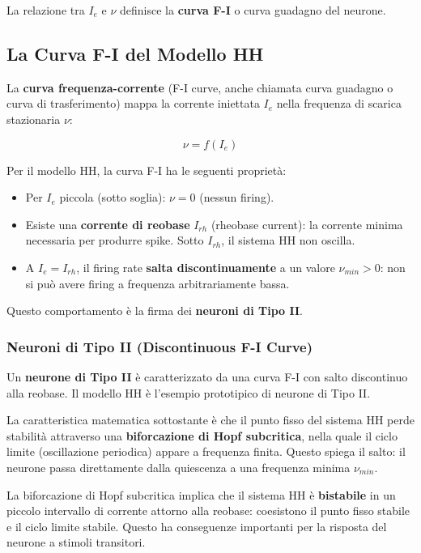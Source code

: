 La relazione tra $I_e$ e $\nu$ definisce la \textbf{curva F-I} o curva guadagno del neurone.


\subsection{La Curva F-I del Modello HH}

La \textbf{curva frequenza-corrente} (F-I curve, anche chiamata curva guadagno o curva di trasferimento) mappa la corrente iniettata $I_e$ nella frequenza di scarica stazionaria $\nu$:

\begin{equation}
\nu = f(I_e)
\end{equation}

Per il modello HH, la curva F-I ha le seguenti proprietà:
\begin{itemize}
    \item Per $I_e$ piccola (sotto soglia): $\nu = 0$ (nessun firing).
    \item Esiste una \textbf{corrente di reobase} $I_{rh}$ (rheobase current): la corrente minima necessaria per produrre spike. Sotto $I_{rh}$, il sistema HH non oscilla.
    \item A $I_e = I_{rh}$, il firing rate \textbf{salta discontinuamente} a un valore $\nu_{min} > 0$: non si può avere firing a frequenza arbitrariamente bassa.
\end{itemize}

Questo comportamento è la firma dei \textbf{neuroni di Tipo II}.

\subsubsection{Neuroni di Tipo II (Discontinuous F-I Curve)}

Un \textbf{neurone di Tipo II} è caratterizzato da una curva F-I con salto discontinuo alla reobase. Il modello HH è l'esempio prototipico di neurone di Tipo II.

La caratteristica matematica sottostante è che il punto fisso del sistema HH perde stabilità attraverso una \textbf{biforcazione di Hopf subcritica}, nella quale il ciclo limite (oscillazione periodica) appare a frequenza finita. Questo spiega il salto: il neurone passa direttamente dalla quiescenza a una frequenza minima $\nu_{min}$.

\begin{tcolorbox}[colback=gray!5, colframe=gray!40, arc=2mm, boxrule=0.5pt]
La biforcazione di Hopf subcritica implica che il sistema HH è \textbf{bistabile} in un piccolo intervallo di corrente attorno alla reobase: coesistono il punto fisso stabile e il ciclo limite stabile. Questo ha conseguenze importanti per la risposta del neurone a stimoli transitori.
\end{tcolorbox}

